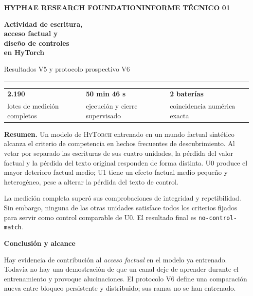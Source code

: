\documentclass[11pt,a4paper]{article}
\newcommand{\sys}{\textsc{HyTorch}}
\newcommand{\status}{\texttt{no-control-match}}
\newcommand{\callout}[2]{\par\vspace{3pt}\begingroup\setlength{\fboxsep}{9pt}%
  \colorbox{light}{\begin{minipage}{\dimexpr\linewidth-2\fboxsep\relax}%
  {\sffamily\bfseries\color{ink}#1}\par\small #2\end{minipage}}\endgroup\par\vspace{3pt}}
\begin{document}
\thispagestyle{empty}

{\sffamily\bfseries\color{teal}\small HYPHAE RESEARCH FOUNDATION\hfill INFORME TÉCNICO 01}
\vspace{15mm}

{\sffamily\bfseries\color{ink}\fontsize{29}{34}\selectfont
Actividad de escritura,\\
acceso factual y\\
diseño de controles\\
en HyTorch\par}
\vspace{5mm}
{\sffamily\large\color{muted}Resultados V5 y protocolo prospectivo V6}

\vspace{6mm}
{\color{teal}\rule{\linewidth}{1.2pt}}
\vspace{2mm}

\begin{tabularx}{\linewidth}{@{}YYY@{}}
{\sffamily\bfseries\Large 2.190} & {\sffamily\bfseries\Large 50 min 46 s} & {\sffamily\bfseries\Large 2 baterías}\\[-2pt]
{\small lotes de medición completos} & {\small ejecución y cierre supervisado} & {\small coincidencia numérica exacta}\\
\end{tabularx}

\vspace{6mm}
\textbf{Resumen.} Un modelo de \sys{} entrenado en un mundo factual sintético
alcanza el criterio de competencia en hechos frecuentes de descubrimiento. Al vetar por separado las
escrituras de sus cuatro unidades, la pérdida del valor factual y la pérdida
del texto original responden de forma distinta. U0 produce el mayor deterioro
factual medio; U1 tiene un efecto factual medio pequeño y heterogéneo, pese a
alterar la pérdida del texto de control.

La medición completa superó sus comprobaciones de integridad y repetibilidad.
Sin embargo, ninguna de las otras unidades satisface todos los criterios fijados
para servir como control comparable de U0. El resultado final es \status.

\callout{Conclusión y alcance}{
Hay evidencia de contribución al \emph{acceso factual} en el modelo ya entrenado.
Todavía no hay una demostración de que un canal deje de aprender durante el
entrenamiento y provoque alucinaciones. El protocolo V6 define una comparación
nueva entre bloqueo persistente y distribuido; sus ramas no se han entrenado.}
\end{document}
